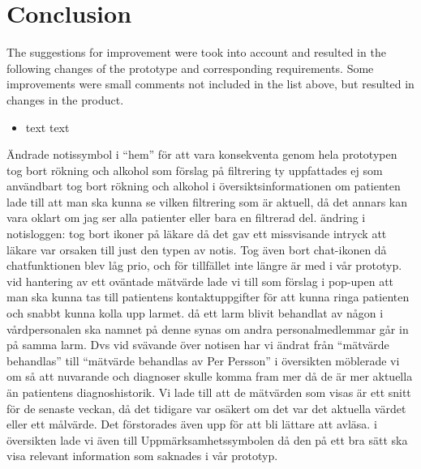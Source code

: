 \documentclass{article}
\begin{document}
	\section{Conclusion}
	
	The suggestions for improvement were took into account and resulted in the following changes of the prototype and corresponding requirements. Some improvements were small comments not included in the list above, but resulted in changes in the product.
	
	\begin{itemize}
		\item text text
	\end{itemize}
	
	Ändrade notissymbol i “hem” för att vara konsekventa genom hela prototypen
	tog bort rökning och alkohol som förslag på filtrering ty uppfattades ej som användbart
	tog bort rökning och alkohol i översiktsinformationen om patienten
	lade till att man ska kunna se vilken filtrering som är aktuell, då det annars kan vara oklart om jag ser alla patienter eller bara en filtrerad del. 
	ändring i notisloggen: tog bort ikoner på läkare då det gav ett missvisande intryck att läkare var orsaken till just den typen av notis. Tog även bort chat-ikonen då chatfunktionen blev låg prio, och för tillfället inte längre är med i vår prototyp. 
	vid hantering av ett oväntade mätvärde lade vi till som förslag i pop-upen att man ska kunna tas till patientens kontaktuppgifter för att kunna ringa patienten och snabbt kunna kolla upp larmet.
	då ett larm blivit behandlat av någon i vårdpersonalen ska namnet på denne synas om andra personalmedlemmar går in på samma larm. Dvs vid svävande över notisen har vi ändrat från “mätvärde behandlas” till “mätvärde behandlas av Per Persson”
	i översikten möblerade vi om så att nuvarande och diagnoser skulle komma fram mer då de är mer aktuella än patientens diagnoshistorik. Vi lade till att de mätvärden som visas är ett snitt för de senaste veckan, då det tidigare var osäkert om det var det aktuella värdet eller ett målvärde. Det förstorades även upp för att bli lättare att avläsa. 
	i översikten lade vi även till Uppmärksamhetssymbolen då den på ett bra sätt ska visa relevant information som saknades i vår prototyp. 
	
\end{document}
